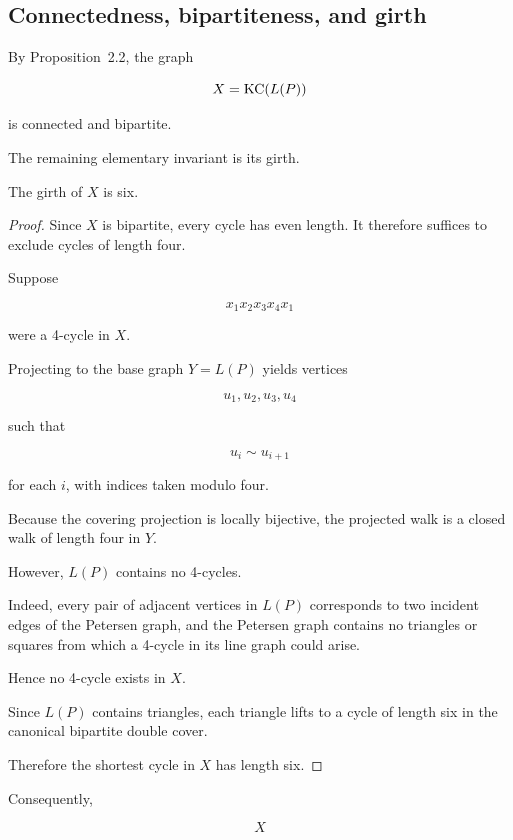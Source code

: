 \subsection{Connectedness, bipartiteness, and girth}

By Proposition~2.2, the graph

\[
X=\operatorname{KC}(L(P))
\]

is connected and bipartite.

The remaining elementary invariant is its girth.

\begin{proposition}

The girth of \(X\) is six.

\end{proposition}

\begin{proof}

Since \(X\) is bipartite, every cycle has even length.
It therefore suffices to exclude cycles of length four.

Suppose

\[
x_1x_2x_3x_4x_1
\]

were a 4-cycle in \(X\).

Projecting to the base graph \(Y=L(P)\) yields vertices

\[
u_1,u_2,u_3,u_4
\]

such that

\[
u_i\sim u_{i+1}
\]

for each \(i\), with indices taken modulo four.

Because the covering projection is locally bijective, the projected walk is
a closed walk of length four in \(Y\).

However, \(L(P)\) contains no 4-cycles.

Indeed, every pair of adjacent vertices in \(L(P)\) corresponds to two
incident edges of the Petersen graph, and the Petersen graph contains no
triangles or squares from which a 4-cycle in its line graph could arise.

Hence no 4-cycle exists in \(X\).

Since \(L(P)\) contains triangles, each triangle lifts to a cycle of length
six in the canonical bipartite double cover.

Therefore the shortest cycle in \(X\) has length six.

\end{proof}

Consequently,

\[
X
\]

